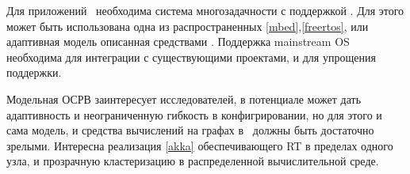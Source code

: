 \label{rtos}\secdown

Для приложений \iot\ необходима система многозадачности с поддержкой .
Для этого может быть использована одна из распространенных  \ref{mbed},\ref{freertos}, или адаптивная
модель описанная средствами \met. Поддержка mainstream OS необходима для интеграции с существующими проектами,
и для упрощения поддержки.

Модельная ОСРВ заинтересует исследователей, в потенциале может дать адаптивность и неограниченную гибкость в конфигрировании,
но для этого и сама модель, и средства вычислений на графах в \met\ должны быть достаточно зрелыми.
Интересна реализация  \ref{akka} обеспечивающего RT в пределах одного узла, и прозрачную кластеризацию в
распределенной вычислительной среде.

\label{mbed}

\label{freertos}

\secup

